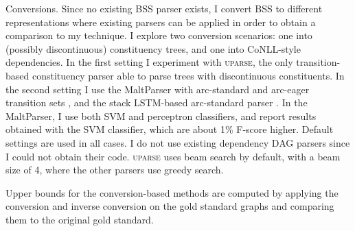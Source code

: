\documentclass[11pt]{article}
\makeatletter
\renewcommand{\paragraph}{
  \@startsection{paragraph}{4}
  {\z@}{.3ex \@plus .3ex \@minus .2ex}{-1em}
  {\normalfont\normalsize\bfseries}
}
\makeatother
\begin{document}

\paragraph{Conversions.}
Since no existing BSS parser exists, I convert BSS to different representations where
existing parsers can be applied in order to obtain a comparison to my technique.
I explore two conversion scenarios: one into (possibly discontinuous) constituency trees,
and one into CoNLL-style dependencies. In the first setting I experiment with \textsc{uparse},
the only transition-based constituency parser able to parse trees with
discontinuous constituents.
In the second setting I use the MaltParser with arc-standard and
arc-eager transition sets \cite{nivre2007maltparser},
and the stack LSTM-based arc-standard parser \cite{dyer2015transition}.
In the MaltParser, I use both SVM and perceptron classifiers, and report
results obtained with the SVM classifier, which are about 1\% F-score higher.
Default settings are used in all cases.
I do not use existing dependency DAG parsers since I could not obtain their code.
\textsc{uparse} uses beam search by default,
with a beam size of 4, where the other parsers use greedy search.




Upper bounds for the conversion-based methods are computed by applying
the conversion and inverse conversion on the gold standard
graphs and comparing them to the original gold standard.
\end{document}
